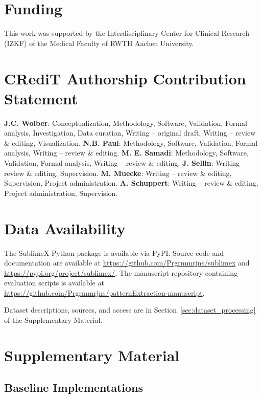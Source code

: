 \documentclass[times, review, 10pt]{elsarticle}
\begin{document}
\section*{Funding}
This work was supported by the Interdisciplinary Center for Clinical Research (IZKF) of the Medical Faculty of RWTH Aachen University.

\section*{CRediT Authorship Contribution Statement}

\textbf{J.C. Wolber}: Conceptualization, Methodology, Software, Validation,
Formal analysis, Investigation, Data curation, Writing -- original draft,
Writing -- review \& editing, Visualization.
\textbf{N.B. Paul}: Methodology, Software, Validation, Formal analysis,
Writing -- review \& editing.
\textbf{M. E. Samadi}: Methodology, Software, Validation, Formal analysis,
Writing -- review \& editing.
\textbf{J. Sellin}: Writing -- review \& editing, Supervision.
\textbf{M. Muecke}: Writing -- review \& editing, Supervision, Project
administration.
\textbf{A. Schuppert}: Writing -- review \& editing, Project administration, Supervision.
\section*{Data Availability}

The SublimeX Python package is available via PyPI.
Source code and documentation are available at \url{https://github.com/Prgrmmrjns/sublimex} and \url{https://pypi.org/project/sublimex/}.
The manuscript repository containing evaluation scripts is available at \url{https://github.com/Prgrmmrjns/patternExtraction-manuscript}.

Dataset descriptions, sources, and access are in Section~\ref{sec:dataset_processing} of the Supplementary Material.






\section{Supplementary Material}

\subsection{Baseline Implementations}
\end{document}
